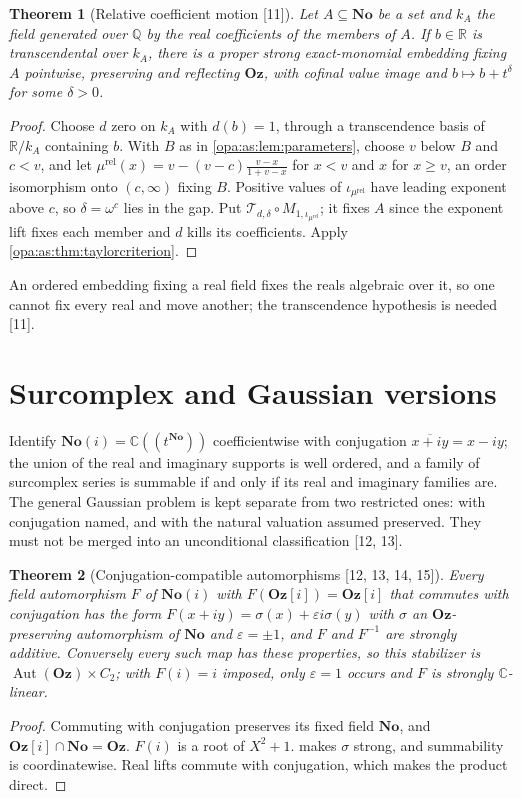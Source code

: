 \documentclass[11pt,oneside]{article}
\numberwithin{equation}{section}
\newtheorem{theorem}{Theorem}[section]
\theoremstyle{definition}
\theoremstyle{remark}
\newcommand{\No}{\mathbf{No}}
\newcommand{\Oz}{\mathbf{Oz}}
\newcommand{\Og}{\mathbf{Oz}[i]}
\newcommand{\SC}{\mathbf{No}(i)}
\newcommand{\R}{\mathbb R}
\newcommand{\C}{\mathbb C}
\newcommand{\Q}{\mathbb Q}
\newcommand{\Aut}{\operatorname{Aut}}
\newcommand{\Hahn}[2]{#1((t^{#2}))}
\newcommand{\src}[1]{\textup{\textsf{\small[#1]}}}
\begin{document}
\begin{theorem}[Relative coefficient motion \src{11}]\label{opa:as:thm:relative}
Let $A\subseteq\No$ be a set and $k_A$ the field generated over $\Q$ by the real coefficients of the members of $A$.
If $b\in\R$ is transcendental over $k_A$, there is a proper strong exact-monomial embedding fixing $A$ pointwise,
preserving and reflecting $\Oz$, with cofinal value image and $b\mapsto b+t^\delta$ for some $\delta>0$.
\end{theorem}
\begin{proof}
Choose $d$ zero on $k_A$ with $d(b)=1$, through a transcendence basis of $\R/k_A$ containing $b$. With $B$ as in
\cref{opa:as:lem:parameters}, choose $v$ below $B$ and $c<v$, and let $\mu^{\mathrm{rel}}(x)=v-(v-c)\frac{v-x}{1+v-x}$
for $x<v$ and $x$ for $x\ge v$, an order isomorphism onto $(c,\infty)$ fixing $B$. Positive values of
$\iota_{\mu^{\mathrm{rel}}}$ have leading exponent above $c$, so $\delta=\omega^c$ lies in the gap. Put
$\mathcal T_{d,\delta}\circ M_{1,\iota_{\mu^{\mathrm{rel}}}}$; it fixes $A$ since the exponent lift fixes each member
and $d$ kills its coefficients. Apply \cref{opa:as:thm:taylorcriterion}.
\end{proof}

An ordered embedding fixing a real field fixes the reals algebraic over it, so one cannot fix every real and move
another; the transcendence hypothesis is needed \src{11}.

\section{Surcomplex and Gaussian versions}\label{opa:as:sec:complex}

Identify $\SC=\Hahn\C\No$ coefficientwise with conjugation $\overline{x+iy}=x-iy$; the union of the real and
imaginary supports is well ordered, and a family of surcomplex series is summable if and only if its real and
imaginary families are. The general Gaussian problem is kept separate from two restricted ones: with conjugation
named, and with the natural valuation assumed preserved. They must not be merged into an unconditional
classification \src{12, 13}.

\begin{theorem}[Conjugation-compatible automorphisms \src{12, 13, 14, 15}]\label{opa:as:thm:conjugation}
Every field automorphism $F$ of $\SC$ with $F(\Og)=\Og$ that commutes with conjugation has the form
$F(x+iy)=\sigma(x)+\varepsilon i\sigma(y)$ with $\sigma$ an $\Oz$-preserving automorphism of $\No$ and
$\varepsilon=\pm1$, and $F$ and $F^{-1}$ are strongly additive. Conversely every such map has these properties, so
this stabilizer is $\Aut(\Oz)\times C_2$; with $F(i)=i$ imposed, only $\varepsilon=1$ occurs and $F$ is strongly
$\C$-linear.
\end{theorem}
\begin{proof}
Commuting with conjugation preserves its fixed field $\No$, and $\Og\cap\No=\Oz$. $F(i)$ is a root of $X^2+1$.
 makes $\sigma$ strong, and summability is coordinatewise. Real lifts commute with
conjugation, which makes the product direct.
\end{proof}
\end{document}
